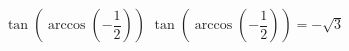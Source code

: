  {$\tan\left(\arccos\left(-\dfrac{1}{2}\right)\right)$ }
{ $\tan\left(\arccos\left(-\dfrac{1}{2}\right)\right) = -\sqrt{3}$}

